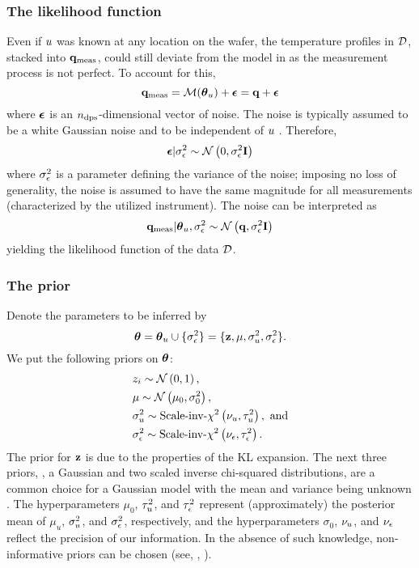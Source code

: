 \subsubsection{The likelihood function}
Even if $u$ was known at any location on the wafer, the temperature profiles in $\mathcal{D}$, stacked into $\mathbf{q}_{\text{meas}}$, could still deviate from the model in  as the measurement process is not perfect. To account for this,
\[
  \mvT_\meas = \model{\vparam_\u} + \vnoise = \mvT + \vnoise
\]
where $\boldsymbol\epsilon$ is an ${n_\text{dps}}$-dimensional vector of noise. The noise is typically assumed to be a white Gaussian noise and to be independent of $u$ \cite{rasmussen2006, marzouk2009}. Therefore,
\[
  \boldsymbol\epsilon | \sigma^2_\epsilon \sim \mathcal{N}\left( 0, \sigma^2_\epsilon \mathbf{I} \right)
\]
where $\sigma^2_\epsilon$ is a parameter defining the variance of the noise; imposing no loss of generality, the noise is assumed to have the same magnitude for all measurements (characterized by the utilized instrument). The noise can be interpreted as
\begin{equation} \elabel{likelihood}
  \mvT_\meas | \vparam_\u, \sigma_\noise^2 \sim \gaussian{\mvT}{\sigma_\noise^2 \mI}
\end{equation}
yielding the likelihood function of the data $\mathcal{D}$.

\subsubsection{The prior}
Denote the parameters to be inferred by
\[
  {\boldsymbol\theta} = {\boldsymbol\theta}_u \cup \{ \sigma_\epsilon^2 \} = \{ \mathbf{z}, \mu, \sigma_u^2, \sigma_\epsilon^2 \}.
\]
We put the following priors on ${\boldsymbol\theta}$:
\begin{align}
  & \z_i \sim \gaussian{0}{1}, \elabel{z-prior} \\
  & \mu \sim \gaussian{\mu_0}{\sigma^2_0}, \elabel{mu-u-prior} \\
  & \sigma^2_\u \sim \sichisquared{\nu_\u}{\tau^2_\u}, \text{ and} \elabel{sigma2-u-prior} \\
  & \sigma^2_\noise \sim \sichisquared{\nu_\noise}{\tau^2_\noise}. \elabel{sigma2-noise-prior}
\end{align}
The prior for $\mathbf{z}$ is due to the properties of the KL expansion. The next three priors, \ie, a Gaussian and two scaled inverse chi-squared distributions, are a common choice for a Gaussian model with the mean and variance being unknown \cite{gelman2004}. The hyperparameters $\mu_0$, $\tau^2_u$, and $\tau^2_\epsilon$ represent (approximately) the posterior mean of $\mu_u$, $\sigma^2_u$, and $\sigma^2_\epsilon$, respectively, and the hyperparameters $\sigma_0$, $\nu_u$, and $\nu_\epsilon$ reflect the precision of our information. In the absence of such knowledge, non-informative priors can be chosen (see, \eg, \cite{gelman2004}).

